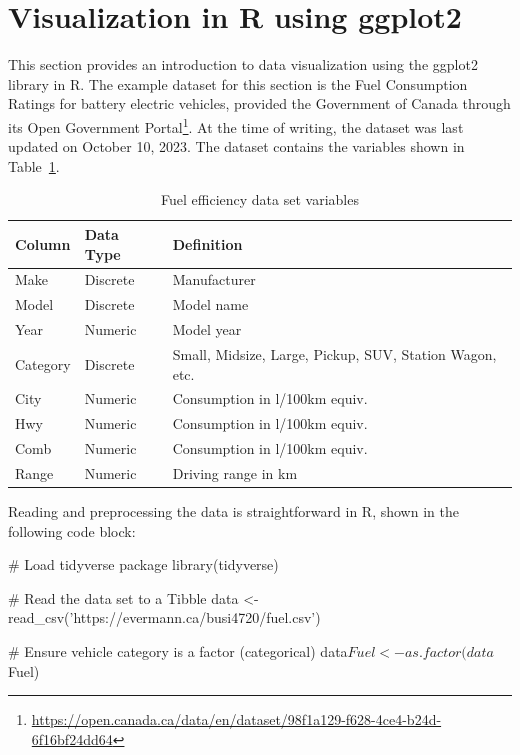 \section{Visualization in R using ggplot2}

This section provides an introduction to data visualization using the ggplot2 library in R. The example dataset for this section is the Fuel Consumption Ratings for battery electric vehicles, provided the Government of Canada through its Open Government Portal\footnote{\scriptsize\url{https://open.canada.ca/data/en/dataset/98f1a129-f628-4ce4-b24d-6f16bf24dd64}}. At the time of writing, the dataset was last updated on October 10, 2023. The dataset contains the variables shown in Table~\ref{tab:fueldata}.

\begin{table}[h]
\centering
\renewcommand{\arraystretch}{1.25}

\begin{tabularx}{\linewidth}{|l|l|X|} \hline
  {\bf Column} & {\bf Data Type} & {\bf Definition} \\ \hline \hline
  Make & Discrete & Manufacturer \\ 
  Model & Discrete & Model name\\
  Year & Numeric & Model year \\
  Category & Discrete & Small, Midsize, Large, Pickup, SUV, Station Wagon, etc. \\
  City & Numeric & Consumption in l/100km equiv. \\
  Hwy & Numeric & Consumption in l/100km equiv. \\
  Comb & Numeric & Consumption in l/100km equiv. \\
  Range & Numeric & Driving range in km \\ \hline
\end{tabularx}
\caption{Fuel efficiency data set variables}
\label{tab:fueldata}
\end{table}

\noindent Reading and preprocessing the data is straightforward in R, shown in the following code block:

\begin{samepage}
\begin{Rcode}
# Load tidyverse package
library(tidyverse)

# Read the data set to a Tibble
data <- read_csv('https://evermann.ca/busi4720/fuel.csv')

# Ensure vehicle category is a factor (categorical)
data$Fuel <- as.factor(data$Fuel)
\end{Rcode}
\end{samepage}


